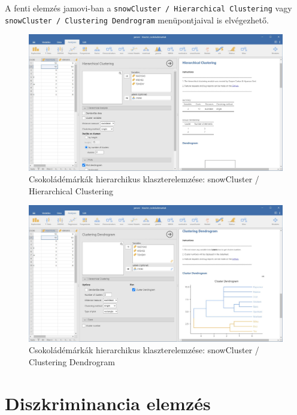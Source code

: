 \documentclass[
  letterpaper,
]{krantz}
\begin{document}
A fenti elemzés jamovi-ban a
\texttt{snowCluster\ /\ Hierarchical\ Clustering} vagy
\texttt{snowCluster\ /\ Clustering\ Dendrogram} menüpontjaival is
elvégezhető.

\begin{figure}

{\centering \includegraphics{./images/klaszter_csokolade_01.jpg}

}

\caption{Csokoládémárkák hierarchikus klaszterelemzése: snowCluster /
Hierarchical Clustering}

\end{figure}

\begin{figure}

{\centering \includegraphics{./images/klaszter_csokolade_02.jpg}

}

\caption{Csokoládémárkák hierarchikus klaszterelemzése: snowCluster /
Clustering Dendrogram}

\end{figure}


\hypertarget{sec-diszkriminancia-elemzes}{%
\chapter{Diszkriminancia elemzés}\label{sec-diszkriminancia-elemzes}}
\end{document}
